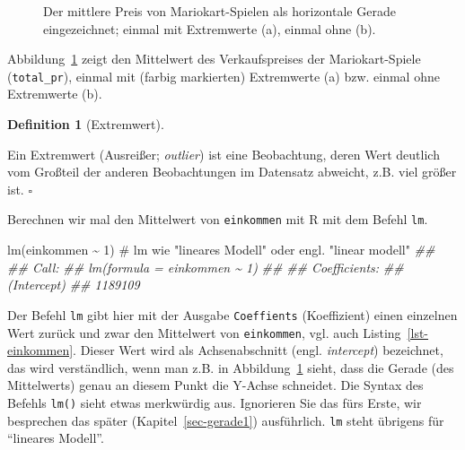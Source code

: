 \documentclass[
  letterpaper,
  oneside,
  open=any]{scrbook}
\newenvironment{Shaded}{\begin{snugshade}}{\end{snugshade}}
\newcommand{\CommentTok}[1]{\textcolor[rgb]{0.37,0.37,0.37}{#1}}
\newcommand{\DecValTok}[1]{\textcolor[rgb]{0.68,0.00,0.00}{#1}}
\newcommand{\DocumentationTok}[1]{\textcolor[rgb]{0.37,0.37,0.37}{\textit{#1}}}
\newcommand{\FunctionTok}[1]{\textcolor[rgb]{0.28,0.35,0.67}{#1}}
\newcommand{\NormalTok}[1]{\textcolor[rgb]{0.00,0.23,0.31}{#1}}
\newcommand{\SpecialCharTok}[1]{\textcolor[rgb]{0.37,0.37,0.37}{#1}}
\theoremstyle{definition}
\theoremstyle{definition}
\theoremstyle{definition}
\newtheorem{definition}{Definition}[chapter]
\theoremstyle{remark}
\begin{document}
\begin{figure}
\begin{minipage}{0.50\linewidth}
{}


\end{minipage}%

\caption{\label{fig-mw2}Der mittlere Preis von Mariokart-Spielen als
horizontale Gerade eingezeichnet; einmal mit Extremwerte (a), einmal
ohne (b).}

\end{figure}%

Abbildung~\ref{fig-mw2} zeigt den Mittelwert des Verkaufspreises der
Mariokart-Spiele (\texttt{total\_pr}), einmal mit (farbig markierten)
Extremwerte (a) bzw. einmal ohne Extremwerte (b).

\begin{definition}[Extremwert]\protect\hypertarget{def-extremwert}{}\label{def-extremwert}

Ein Extremwert (Ausreißer; \emph{outlier}) ist eine Beobachtung, deren
Wert deutlich vom Großteil der anderen Beobachtungen im Datensatz
abweicht, z.B. viel größer ist. \(\square\)

\end{definition}

Berechnen wir mal den Mittelwert von \texttt{einkommen} mit R mit dem
Befehl \texttt{lm}.

\begin{Shaded}
\begin{Highlighting}[]
\FunctionTok{lm}\NormalTok{(einkommen }\SpecialCharTok{\textasciitilde{}} \DecValTok{1}\NormalTok{)  }\CommentTok{\# lm wie "lineares Modell" oder engl. "linear modell"}
\DocumentationTok{\#\# }
\DocumentationTok{\#\# Call:}
\DocumentationTok{\#\# lm(formula = einkommen \textasciitilde{} 1)}
\DocumentationTok{\#\# }
\DocumentationTok{\#\# Coefficients:}
\DocumentationTok{\#\# (Intercept)  }
\DocumentationTok{\#\#     1189109}
\end{Highlighting}
\end{Shaded}

Der Befehl \texttt{lm} gibt hier mit der Ausgabe \texttt{Coeffients}
(Koeffizient) einen einzelnen Wert zurück und zwar den Mittelwert von
\texttt{einkommen}, vgl. auch Listing~\ref{lst-einkommen}. Dieser Wert
wird als Achsenabschnitt (engl. \emph{intercept}) bezeichnet, das wird
verständlich, wenn man z.B. in Abbildung~\ref{fig-mw2} sieht, dass die
Gerade (des Mittelwerts) genau an diesem Punkt die Y-Achse schneidet.
Die Syntax des Befehls \texttt{lm()} sieht etwas merkwürdig aus.
Ignorieren Sie das fürs Erste, wir besprechen das später
(Kapitel~\ref{sec-gerade1}) ausführlich. \texttt{lm} steht übrigens für
\enquote{lineares Modell}.
\end{document}
